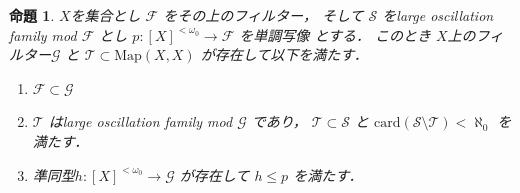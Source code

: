 \documentclass[leqno, a4paper, 12pt]{jsarticle}
\newtheorem{prop}[thm]{命題}
\newcommand{\card}{\mathrm{card}}
\newcommand{\myfinset}[1]{[#1]^{<\omega_{0}}}
\newcommand{\myfil}[1]{\mathcal{#1}}
\newcommand{\myfam}[1]{\mathscr{#1}}
\newcommand{\mymap}[2]{\mathrm{Map}(#1, #2)}
\begin{document}
\begin{prop}\label{prop:sagesecond}
$X$を集合とし
$\myfil{F}$
をその上のフィルター，
そして
$\myfam{S}$
をlarge oscillation family mod $\myfil{F}$
とし
$p\colon \myfinset{X}\to \myfil{F}$
を単調写像
とする．
このとき
$X$上のフィルター$\myfil{G}$
と
$\myfam{T}\subset \mymap{X}{X}$
が存在して以下を満たす．
\begin{enumerate}[label=\textup{(\arabic*)}]
\item 
$\myfil{F}\subset \myfil{G}$
\item 
$\myfam{T}$
はlarge oscillation family mod $\myfam{G}$
であり，
$\myfam{T}\subset \myfam{S}$
と
$\card(\myfam{S}\setminus \myfam{T})<\aleph_{0}$
を満たす．
\item 
準同型$h\colon \myfinset{X}\to \myfil{G}$
が存在して
$h\le p$
を満たす．
\end{enumerate}
\end{prop}
\end{document}
